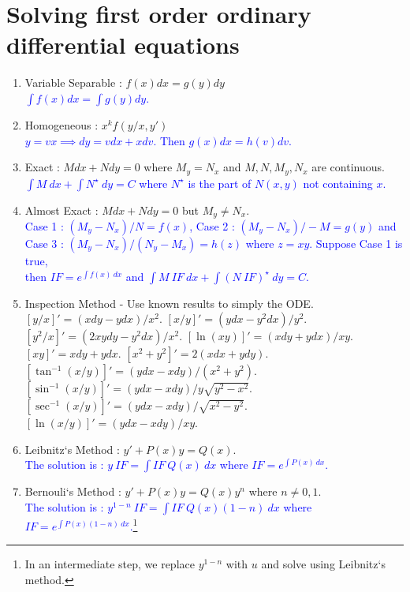 \section{Solving first order ordinary differential equations}
\begin{enumerate}
	\item Variable Separable : $f(x)dx = g(y)dy$\\ 
	\textcolor{blue}{$\int f(x) dx = \int g(y) dy$.}
	\item Homogeneous : $x^k f(y/x,y')$ \\ 
	\textcolor{blue}{$y= vx \implies dy = vdx + xdv$. Then $g(x)dx = h(v)dv$.}
	\item Exact : $Mdx + Ndy = 0$ where $M_y = N_x$ and $M,N,M_y,N_x$ are continuous.\\
	\textcolor{blue}{$\int M\ dx + \int N^\star\ dy = C$ where $N^\star$ is the part of $N(x,y)$ not containing $x$.}
	\item Almost Exact : $Mdx + Ndy = 0$ but $M_y \ne N_x$. \\
		\textcolor{blue}{Case 1 : $(M_y - N_x)/N = f(x)$, Case 2 : $(M_y-N_x)/-M = g(y)$ and\\ Case 3 : $(M_y - N_x)/(N_y - M_x) = h(z)$ where $z = xy$.
		Suppose Case 1 is true,\\ then $I\!F = e^{\int f(x)\ dx}$ and $\int M\ I\!F\ dx + \int (N\ I\!F)^\star\ dy = C$.}
	\item Inspection Method - Use known results to simply the ODE.
		{\color{blue}
		\subitem $[y/x]' = (xdy - ydx)/x^2$.
		\subitem $[x/y]' = (ydx - y^2dx)/y^2$.
		\subitem $[y^2/x]' = (2xydy - y^2dx)/x^2$.
		\subitem $[\ln(xy)]' = (xdy+ydx)/xy$.
		\subitem $[xy]' = xdy + ydx$.
		\subitem $[x^2+y^2]' = 2(xdx + ydy)$.
		\subitem $[\tan^{-1} (x/y)]' = (ydx-xdy)/(x^2+y^2)$.
		\subitem $[\sin^{-1} (x/y)]' = (ydx-xdy)/y\sqrt{y^2-x^2}$.
		\subitem $[\sec^{-1} (x/y)]' = (ydx-xdy)/\sqrt{x^2-y^2}$.
		\subitem $[\ln(x/y)]' = (ydx-xdy)/xy$.
		}
	\item Leibnitz`s Method : $y'+P(x)y = Q(x)$.\\ 
	\textcolor{blue}{The solution is : $y\ I\!F = \int I\!F\ Q(x)\ dx$ where $I\!F = e^{\int P(x)\ dx}$.}
	\item Bernouli`s Method : $y'+P(x)y = Q(x)y^n$ where $n \ne 0,1$.\\ 
	\textcolor{blue}{The solution is : $y^{1-n}\ I\!F = \int I\!F\ Q(x)(1-n)\ dx$ where $I\!F = e^{\int P(x)(1-n)\ dx}$.\footnote{In an intermediate step, we replace $y^{1-n}$ with $u$ and solve using Leibnitz`s method.}}
\end{enumerate}

